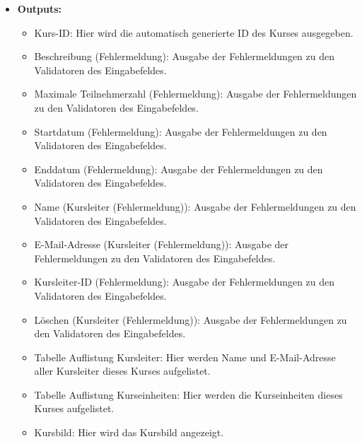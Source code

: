 \begin{itemize}
			\item \textbf{Outputs:}
				\begin{itemize}
					\item Kurs-ID: Hier wird die automatisch generierte ID des Kurses ausgegeben.
					\item Beschreibung (Fehlermeldung): Ausgabe der Fehlermeldungen zu den Validatoren des Eingabefeldes.
					\item Maximale Teilnehmerzahl (Fehlermeldung): Ausgabe der Fehlermeldungen zu den Validatoren des Eingabefeldes.
					\item Startdatum (Fehlermeldung): Ausgabe der Fehlermeldungen zu den Validatoren des Eingabefeldes.
					\item Enddatum (Fehlermeldung): Ausgabe der Fehlermeldungen zu den Validatoren des Eingabefeldes.
					\item Name (Kursleiter (Fehlermeldung)): Ausgabe der Fehlermeldungen zu den Validatoren des Eingabefeldes.
					\item E-Mail-Adresse (Kursleiter (Fehlermeldung)): Ausgabe der Fehlermeldungen zu den Validatoren des Eingabefeldes.
					\item Kursleiter-ID (Fehlermeldung): Ausgabe der Fehlermeldungen zu den Validatoren des Eingabefeldes.
					\item Löschen (Kursleiter (Fehlermeldung)): Ausgabe der Fehlermeldungen zu den Validatoren des Eingabefeldes.
					\item Tabelle Auflistung Kursleiter: Hier werden Name und E-Mail-Adresse aller Kursleiter dieses Kurses aufgelistet.
					\item Tabelle Auflistung Kurseinheiten: Hier werden die Kurseinheiten dieses Kurses aufgelistet.
					\item Kursbild: Hier wird das Kursbild angezeigt.
				\end{itemize}
				
				\begin{center}
					\begin{longtable}{|p{5cm} | p{4cm}|p{5cm}|}
						

\end{longtable}
\end{center}
\end{itemize}
